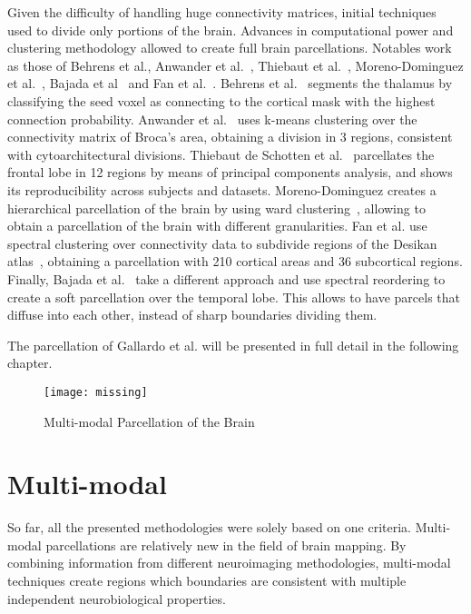 Given the difficulty of handling huge connectivity matrices, initial techniques
used to divide only portions of the brain\cite{Behrens2003, Jbabdi2009, Anwander2006, ThiebautdeSchotten2014, ThiebautdeSchotten2016, Bajada2017}.
Advances in computational power and clustering methodology allowed to create
full brain parcellations\cite{Roca2009, Clarkson2010, Lefranc2016, Fan2016, Moreno-Dominguez2014, Muircheartaigh2018, Lefranc2016, Paristot2015, Roca2009, Gallardo2017a, Muircheartaigh2018}. 
Notables work as those of Behrens et al.\cite{Behrens2003}, Anwander et al.~\cite{Anwander2006},
Thiebaut et al.~\cite{ThiebautdeSchotten2016}, Moreno-Dominguez et al.~\cite{Moreno-Dominguez2014},
Bajada et al~\cite{Bajada2017} and Fan et al.~\cite{Fan2016}.
Behrens et al.~\cite{Behrens2003} segments the thalamus by classifying the seed voxel as connecting to the cortical
mask with the highest connection probability. Anwander et al.~\cite{Anwander2006}
uses k-means clustering over the connectivity matrix of Broca's area, obtaining
a division in 3 regions, consistent with cytoarchitectural divisions.
Thiebaut de Schotten et al.~\cite{ThiebautdeSchotten2016}
parcellates the frontal lobe in 12 regions by means of principal components analysis,
and shows its reproducibility across subjects and datasets.
Moreno-Dominguez creates a hierarchical parcellation of the brain by using
ward clustering~\cite{Moreno-Dominguez2014}, allowing to obtain a parcellation
of the brain with different granularities. Fan et al.\cite{Fan2016} use
spectral clustering over connectivity data to subdivide regions of the Desikan
atlas~\cite{Desikan2006}, obtaining a parcellation with 210 cortical areas and
36 subcortical regions. Finally, Bajada et al.~\cite{Bajada2017} take a different
approach and use spectral reordering to create a soft parcellation over the
temporal lobe. This allows to have parcels that diffuse into each other, instead
of sharp boundaries dividing them.

The parcellation of Gallardo et al.\cite{Gallardo2017a} will be presented in
full detail in the following chapter.

\begin{figure*}[t]
    \texttt{[image: missing]}
    \caption{Multi-modal Parcellation of the Brain}
    \label{fig:brain_function}
\end{figure*}

\section{Multi-modal}
\label{sec:multimodal}
So far, all the presented methodologies were solely based on one criteria.
Multi-modal parcellations are relatively new in the field of brain mapping.
By combining information from different neuroimaging methodologies, multi-modal
techniques create regions which boundaries are consistent with multiple
independent neurobiological properties.

